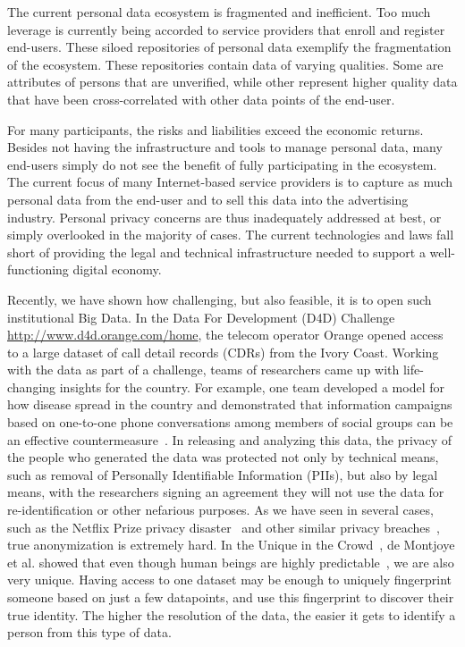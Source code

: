 The current personal data ecosystem is fragmented and inefficient.
Too much leverage is currently being accorded to service providers that enroll
and register end-users.
These siloed repositories of personal data exemplify the fragmentation of the ecosystem.
These repositories contain data of varying qualities.
Some are attributes of persons that are unverified, while other represent higher quality data that have been cross-correlated with other data points of the end-user.

For many participants, the risks and liabilities exceed the economic returns.
Besides not having the infrastructure and tools to manage personal data, many end-users simply do not see the benefit of fully participating in the ecosystem.
The current focus of many Internet-based service providers is to capture as much personal data from the end-user and to sell this data into the advertising industry.
Personal privacy concerns are thus inadequately addressed at best, or simply overlooked in the majority of cases.
The current technologies and laws fall short of providing the legal and technical infrastructure needed to support a well-functioning digital economy.

Recently, we have shown how challenging, but also feasible, it is to open such institutional Big Data.
In the Data For Development (D4D) Challenge \url{http://www.d4d.orange.com/home}, the telecom operator Orange opened access to a large dataset of call detail records (CDRs) from the Ivory Coast.
Working with the data as part of a challenge, teams of researchers came up with life-changing insights for the country. For example, one team developed a model for how disease spread in the country and demonstrated that information campaigns based on one-to-one phone conversations among members of social groups can be an effective countermeasure~\cite{lima2013exploiting}. 
In releasing and analyzing this data, the privacy of the people who generated the data was protected not only by technical means, such as removal of Personally Identifiable Information (PIIs), but also by legal means, with the researchers signing an agreement they will not use the data for re-identification or other nefarious purposes.
As we have seen in several cases, such as the Netflix Prize privacy disaster~\cite{narayanan2008robust} and other similar privacy breaches~\cite{sweeney2000simple}, true anonymization is extremely hard.
In the Unique in the Crowd~\cite{de2013unique}, de Montjoye et al. showed that even though human beings are highly predictable~\cite{song2010limits}, we are also very unique.
Having access to one dataset may be enough to uniquely fingerprint someone based on just a few datapoints, and use this fingerprint to discover their true identity.
The higher the resolution of the data, the easier it gets to identify a person from this type of data.

